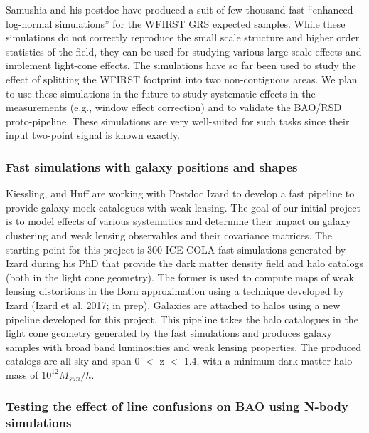  Samushia and his postdoc have produced a suit of few thousand fast
 ``enhanced log-normal simulations'' for the WFIRST GRS expected samples. While
 these simulations do  not correctly reproduce the small scale structure and
 higher order statistics of the field, they can be used for studying various
 large scale effects and implement light-cone effects. The simulations have so
 far been used to study the effect of splitting the WFIRST footprint into two
 non-contiguous areas. We plan to use these simulations in the future to study
 systematic effects in the measurements (e.g., window effect correction) and to
 validate the BAO/RSD proto-pipeline. These simulations are very well-suited for
 such tasks since their input two-point signal is known exactly.

 \subsubsection{Fast simulations with galaxy positions and shapes}

 Kiessling, and Huff are working with Postdoc Izard to develop a fast
 pipeline to provide galaxy mock catalogues with weak lensing. The goal of our
 initial project is to model effects of various systematics and determine their
 impact on galaxy clustering and weak lensing observables and their covariance
 matrices. The starting point for this project is  300 ICE-COLA fast simulations
 \cite{Tassev:2013pn,Izard:2015dja} generated by Izard during his PhD that
 provide the dark matter density field and halo catalogs (both in the light cone
 geometry). The former is used to compute maps of weak lensing distortions in
 the Born approximation using a technique developed by Izard (Izard et al, 2017;
 in prep). Galaxies are attached to halos using a new pipeline developed for
 this project. This pipeline takes the halo catalogues in the light cone
 geometry generated by the fast simulations and produces galaxy samples with
 broad band luminosities and weak lensing properties. The produced catalogs are
 all sky and span 0 $<$ z $<$ 1.4, with a minimum dark matter halo mass of
 $10^{12}  M_{sun}/h$.

 \subsubsection{Testing the effect of line confusions on BAO using N-body simulations}

